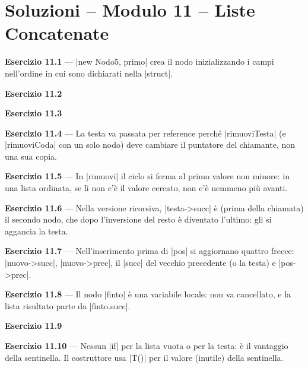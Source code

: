 \chapter{Soluzioni -- Modulo 11 -- Liste Concatenate}

\textbf{Esercizio 11.1} --- \cc|new Nodo{5, primo}| crea il nodo inizializzando i campi
nell'ordine in cui sono dichiarati nella \cc|struct|.

\textbf{Esercizio 11.2}

\textbf{Esercizio 11.3}

\textbf{Esercizio 11.4} --- La testa va passata per reference perché
\cc|rimuoviTesta| (e \cc|rimuoviCoda| con un solo nodo) deve cambiare il puntatore del
chiamante, non una sua copia.

\textbf{Esercizio 11.5} --- In \cc|rimuovi| il ciclo si ferma al primo valore non minore:
in una lista ordinata, se lì non c'è il valore cercato, non c'è nemmeno più avanti.

\textbf{Esercizio 11.6} --- Nella versione ricorsiva, \cc|testa->succ| è (prima della
chiamata) il secondo nodo, che dopo l'inversione del resto è diventato l'ultimo: gli si
aggancia la testa.

\textbf{Esercizio 11.7} --- Nell'inserimento prima di \cc|pos| si aggiornano quattro
frecce: \cc|nuovo->succ|, \cc|nuovo->prec|, il \cc|succ| del vecchio precedente (o la
testa) e \cc|pos->prec|.

\textbf{Esercizio 11.8} --- Il nodo \cc|finto| è una variabile locale: non va
cancellato, e la lista risultato parte da \cc|finto.succ|.

\textbf{Esercizio 11.9}

\textbf{Esercizio 11.10} --- Nessun \cc|if| per la lista vuota o per la testa: è il
vantaggio della sentinella. Il costruttore usa \cc|T()| per il valore (inutile) della
sentinella.
